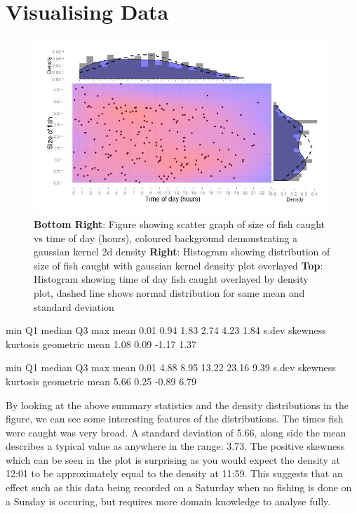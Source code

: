 \documentclass{article}
\begin{document}
\section{Visualising Data}
\begin{figure}[h]
\includegraphics[width=\linewidth]{figure1.jpg}
\caption{\textbf{Bottom Right}: Figure showing scatter graph of size of fish caught vs time of day (hours), coloured background demonstrating a gaussian kernel 2d density \textbf{Right}: Histogram showing distribution of size of fish caught with gaussian kernel density plot overlayed \textbf{Top}: Histogram showing time of day fish caught overlayed by density plot, dashed line shows normal distribution for same mean and standard deviation}
\end{figure}
\begin{Schunk}
\begin{Soutput}
           min             Q1         median             Q3            max           mean 
          0.01           0.94           1.83           2.74           4.23           1.84 
         s.dev       skewness       kurtosis geometric mean 
          1.08           0.09          -1.17           1.37 
\end{Soutput}
\begin{Soutput}
           min             Q1         median             Q3            max           mean 
          0.01           4.88           8.95          13.22          23.16           9.39 
         s.dev       skewness       kurtosis geometric mean 
          5.66           0.25          -0.89           6.79 
\end{Soutput}
\end{Schunk}
By looking at the above summary statistics and the density distributions in the figure, we can see some interesting features of the distributions. The times fish were caught was very broad. A standard deviation of 5.66, along side the mean describes a typical value as anywhere in the range: 3.73. The positive skewness which can be seen in the plot is surprising as you would expect the density at 12:01 to be approximately equal to the density at 11:59. This suggests that an effect such as this data being recorded on a Saturday when no fishing is done on a Sunday is occuring, but requires more domain knowledge to analyse fully. 
\end{document}
